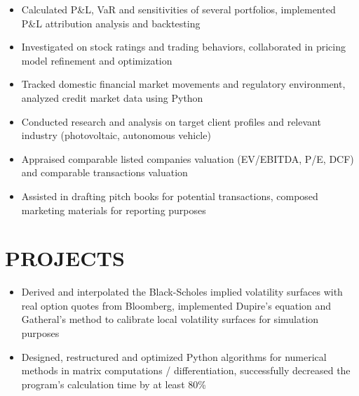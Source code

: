 \documentclass[cmu]{resume}
\begin{document}
    \begin{itemize}
        \item Calculated P\&L, VaR and sensitivities of several portfolios, implemented P\&L attribution analysis and backtesting
        \item Investigated on stock ratings and trading behaviors, collaborated in pricing model refinement and optimization
        \item Tracked domestic financial market movements and regulatory environment, analyzed credit market data using Python
    \end{itemize}

    \begin{itemize}
        \item Conducted research and analysis on target client profiles and relevant industry (photovoltaic, autonomous vehicle)
        \item Appraised comparable listed companies valuation (EV/EBITDA, P/E, DCF) and comparable transactions valuation
        \item Assisted in drafting pitch books for potential transactions, composed marketing materials for reporting purposes
    \end{itemize}
    \section{PROJECTS}
    \begin{itemize}
        \item Derived and interpolated the Black-Scholes implied volatility surfaces with real option quotes from Bloomberg, implemented Dupire's equation and Gatheral's method to calibrate local volatility surfaces for simulation purposes
        \item Designed, restructured and optimized Python algorithms for numerical methods in matrix computations / differentiation, successfully decreased the program's calculation time by at least 80\%
    \end{itemize}
\end{document}
